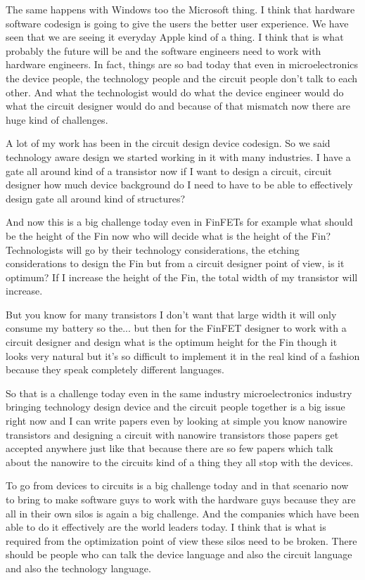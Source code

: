 \begin{multicols}{2}
The same happens with Windows too the Microsoft thing. I think that hardware software codesign is going to give the users the better user experience. We have seen that we are seeing it everyday Apple kind of a thing. I think that is what probably the future will be and the software engineers need to work with hardware engineers. In fact, things are so bad today that even in microelectronics the device people, the technology people and the circuit people don’t talk to each other. And what the technologist would do what the device engineer would do what the circuit designer would do and because of that mismatch now there are huge kind of challenges.

A lot of my work has been in the circuit design device codesign. So we said technology aware design we started working in it with many industries. I have a gate all around kind of a transistor now if I want to design a circuit, circuit designer how much device background do I need to have to be able to effectively design gate all around kind of structures? 

And now this is a big challenge today even in FinFETs for example what should be the height of the Fin now who will decide what is the height of the Fin? Technologists will go by their technology considerations, the etching considerations to design the Fin but from a circuit designer point of view, is it optimum? If I increase the height of the Fin, the total width of my transistor will increase.

But you know for many transistors I don’t want that large width it will only consume my battery so the... but then for the FinFET designer to work with a circuit designer and design what is the optimum height for the Fin though it looks very natural but it’s so difficult to implement it in the real kind of a fashion because they speak completely different languages.

So that is a challenge today even in the same industry microelectronics industry bringing technology design device and the circuit people together is a big issue right now and I can write papers even by looking at simple you know nanowire transistors and designing a circuit with nanowire transistors those papers get accepted anywhere just like that because there are so few papers which talk about the nanowire to the circuits kind of a thing they all stop with the devices.

To go from devices to circuits is a big challenge today and in that scenario now to bring to make software guys to work with the hardware guys because they are all in their own silos is again a big challenge. And the companies which have been able to do it effectively are the world leaders today. I think that is what is required from the optimization point of view these silos need to be broken. There should be people who can talk the device language and also the circuit language and also the technology language.


\end{multicols}
